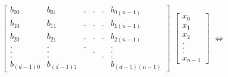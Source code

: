     \begin{center}
        $\begin{bmatrix}
                b_{0 0} & b_{0 1} & . & . & . & b_{0 (n-1)}\\
                b_{1 0} & b_{1 1} & . & . & . & b_{1 (n-1)}\\
                b_{2 0} & b_{2 1} & . & . & . & b_{2 (n-1)}\\
                .      & .      & . &   &   & .     \\
                .      & .      &   & . &   & .     \\
                .      & .      &   &   & . & .     \\
                b_{(d-1) 0} & b_{(d-1) 1} &   &   &   & b_{(d-1) (n-1)}
            \end{bmatrix}$
        $\begin{bmatrix}
            x_0\\
            x_1\\
            x_2\\
            .  \\
            .  \\
            .  \\
            x_{n-1}
        \end{bmatrix}$
        $\Leftrightarrow$\\
    \end{center}

